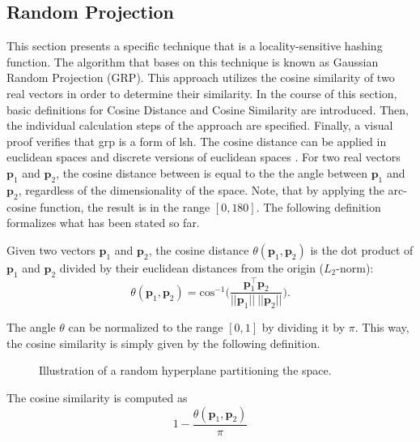 \documentclass[../../../main.tex]{subfiles}
\begin{document}
\subsection{Random Projection}\label{subsec:random_projection}

This section presents a specific technique that is a locality-sensitive hashing function. The algorithm that bases on this technique is known as Gaussian Random Projection (GRP). This approach utilizes the cosine similarity of two real vectors in order to determine their similarity. In the course of this section, basic definitions for Cosine Distance and Cosine Similarity are introduced. Then, the individual calculation steps of the approach are specified. Finally, a visual proof verifies that \gls{grp} is a form of \gls{lsh}.
\newpage
The cosine distance can be applied in euclidean spaces and discrete versions of euclidean spaces \cite[95]{leskovec_rajaraman_ullman_2014}. For two real vectors $\bm{p}_1$ and $\bm{p}_2$, the cosine distance between is equal to the the angle between $\bm{p}_1$ and $\bm{p}_2$, regardless of the dimensionality of the space. Note, that by applying the arc-cosine function, the result is in the range $[0, 180]$. The following definition formalizes what has been stated so far.

\begin{definition}
    Given two vectors $\bm{p}_1$ and $\bm{p}_2$, the cosine distance $\theta(\bm{p}_1, \bm{p}_2)$ is the dot product of $\bm{p}_1$ and $\bm{p}_2$ divided by their euclidean distances from the origin ($L_2$-norm):
    \begin{equation}
        \theta(\bm{p}_1, \bm{p}_2) = \text{cos}^{-1} \bigg( \frac{\bm{p}_1^\top \bm{p}_2}{||\bm{p}_1|| \: ||\bm{p}_2||} \Bigg).
    \end{equation}
\end{definition}

The angle $\theta$ can be normalized to the range $[0, 1]$ by dividing it by $\pi$. This way, the cosine similarity is simply given by the following definition.

\begin{figure}[t!]
    \centering
    
    \caption{Illustration of a random hyperplane partitioning the space.}
    \label{fig:rp_3d}
\end{figure}

\begin{definition}
    The cosine similarity is computed as
    \begin{equation}
        1- \frac{\theta(\bm{p}_1, \bm{p}_2)}{\pi}
    \end{equation}
\end{definition}
\end{document}
